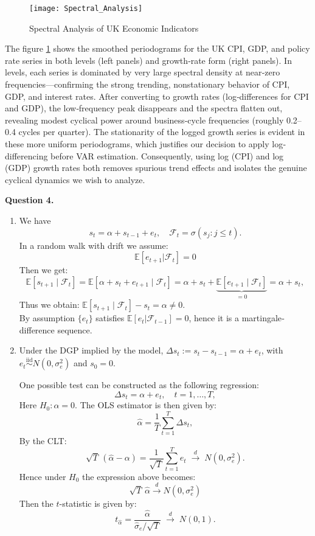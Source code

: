 \documentclass[a4paper,12pt]{article}
\newcommand{\bbE}{\mathbb E}
\newenvironment{solution}[1]
{\par\bigskip\noindent\textbf{Question #1.}\enskip\ignorespaces}
{}
\newcounter{solution}
\theoremstyle{remark}
\begin{document}
\begin{figure}[H]
  \centering
  \texttt{[image: Spectral\_Analysis]}
  \caption{Spectral Analysis of UK Economic Indicators}
  \label{fig:spectral_analysis}
\end{figure}
The figure \ref{fig:spectral_analysis} shows the smoothed periodograms for the UK CPI, GDP, and policy rate series in both levels (left panels) and growth‐rate form (right panels). In levels, each series is dominated by very large spectral density at near‐zero frequencies—confirming the strong trending, nonstationary behavior of CPI, GDP, and interest rates. After converting to growth rates (log‐differences for CPI and GDP), the low‐frequency peak disappears and the spectra flatten out, revealing modest cyclical power around business‐cycle frequencies (roughly 0.2–0.4 cycles per quarter). The stationarity of the logged growth series is evident in these more uniform periodograms, which justifies our decision to apply log‐differencing before VAR estimation. Consequently, using log (CPI) and log (GDP) growth rates both removes spurious trend effects and isolates the genuine cyclical dynamics we wish to analyze.

\begin{solution}{4}
	\begin{enumerate}
		\item 
		We have 
		\[
		s_t = \alpha + s_{t-1} + e_t,
		\quad
		\mathcal F_t=\sigma(s_j\colon j\le t).
		\]
		In a random walk with drift we assume:
		\[\bbE[e_{t+1}|\mathcal{F}_t] = 0\]
		Then we get:
		\[
		\bbE[s_{t+1}\mid\mathcal F_t]
		= \bbE[\alpha + s_t + e_{t+1}\mid\mathcal{F}_t]
		= \alpha + s_t + \underbrace{\bbE[e_{t+1}\mid\mathcal{F}_t]}_{=0}
		= \alpha + s_t,
		\]
		Thus we obtain: 
		\(\bbE[s_{t+1}\mid\mathcal F_t]-s_t=\alpha\neq0\).  \\
		By assumption \(\{e_t\}\) satisfies \(\bbE[e_t|\mathcal{F}_{t-1}]=0\), hence it is a martingale‐difference sequence.
		
		\item 
		Under the DGP implied by the model,
		\(\Delta s_t := s_t - s_{t-1} = \alpha + e_t\),
		with $e_t \overset{\mathrm{iid}}{\sim} N(0,\sigma_e^2)$ and \(s_0=0\).  
		
		One possible test can be constructed as the following regression:
		\[
		\Delta s_t = \alpha + e_t,
		\quad t=1,\dots,T,
		\]
		Here \(H_0\colon\alpha=0\).  The OLS estimator is then given by:
		\[
		\hat\alpha
		= \frac1T\sum_{t=1}^T\Delta s_t,
		\]
		By the CLT:
		\[
		\sqrt T\,(\hat\alpha-\alpha)
		= \frac1{\sqrt T}\sum_{t=1}^T e_t
		\;\xrightarrow{d}\;N(0,\sigma_e^2).
		\]
		Hence under \(H_0\) the expression above becomes:
		\[\sqrt T\,\hat\alpha\xrightarrow{d} N(0,\sigma_e^2)\]
		Then the \(t\)-statistic is given by:
		\[
		t_{\hat\alpha}
		= \frac{\hat\alpha}{\hat\sigma_e/\sqrt T}
		\;\xrightarrow{d}\;N(0,1).
		\]
	\end{enumerate}
\end{solution}
\end{document}
